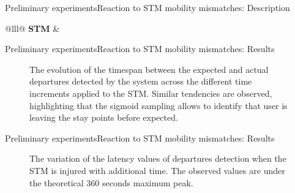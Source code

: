 \begin{frame}{Preliminary experiments}{Reaction to STM mobility mismatches: Description}
\begin{table}
{\begin{tabular}{@{}lll@{}}
\textbf{STM} & 
\\
\bottomrule
\end{tabular}%
}
\caption{Input parameters for the reaction to mobility mismatches experiment.}
\label{tab:exp-3-input-parameters}
\end{table}
\end{frame}


\begin{frame}{Preliminary experiments}{Reaction to STM mobility mismatches: Results}
\begin{figure}
  \centering
  \caption{The evolution of the timespan between the expected and actual departures detected by the system across the different time increments applied to the STM. Similar tendencies are observed, highlighting that the sigmoid sampling allows to identify that user is leaving the stay points before expected.}
  \label{fig:exp-3-departure-delay}
\end{figure}
\end{frame}

\begin{frame}{Preliminary experiments}{Reaction to STM mobility mismatches: Results}
\begin{figure}
  \centering
  \caption{The variation of the latency values of departures detection when the STM is injured with additional time. The observed values are under the theoretical 360 seconds maximum peak.}
  \label{fig:exp-3-departure-latency}
\end{figure}
\end{frame}

